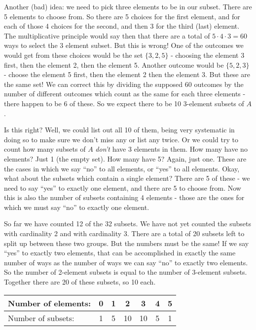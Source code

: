 \documentclass[12pt]{article}
\begin{document}
Another (bad) idea: we need to pick three elements to be in our subset.  There are 5 elements to choose from.  So there are 5 choices for the first element, and for each of those 4 choices for the second, and then 3 for the third (last) element.  The multiplicative principle would say then that there are a total of $5 \cdot 4 \cdot 3 = 60$ ways to select the 3 element subset.  But this is wrong!  One of the outcomes we would get from these choices would be the set $\{3,2,5\}$ - choosing the element 3 first, then the element 2, then the element 5.  Another outcome would be $\{5,2,3\}$ - choose the element 5 first, then the element 2 then the element 3.  But these are the same set!  We can correct this by dividing the supposed 60 outcomes by the number of different outcomes which count as the same for each three elements - there happen to be 6 of these.  So we expect there to be 10 3-element subsets of $A$.

Is this right?  Well, we could list out all 10 of them, being very systematic in doing so to make sure we don't miss any or list any twice.  Or we could try to count how many subsets of $A$ {\em don't} have 3 elements in them.  How many have no elements?  Just 1 (the empty set).  How many have 5?  Again, just one.  These are the cases in which we say ``no'' to all elements, or ``yes'' to all elements.  Okay, what about the subsets which contain a single element?  There are 5 of these - we need to say ``yes'' to exactly one element, and there are 5 to choose from.  Now this is also the number of subsets containing 4 elements - those are the ones for which we must say ``no'' to exactly one element.  

So far we have counted 12 of the 32 subsets.  We have not yet counted the subsets with cardinality 2 and with cardinality 3.  There are a total of 20 subsets left to split up between these two groups.  But the numbers must be the same!  If we say ``yes'' to exactly two elements, that can be accomplished in exactly the same number of ways as the number of ways we can say ``no'' to exactly two elements.  So the number of 2-element subsets is equal to the number of 3-element subsets.  Together there are 20 of these subsets, so 10 each.

\begin{center}
\begin{tabular}{l|c|c|c|c|c|c}
  Number of elements: & 0 & 1 & 2 & 3 & 4 & 5 \\ \hline
  Number of subsets: & 1 & 5 & 10 & 10 & 5 & 1
\end{tabular}
\end{center}
\end{document}

